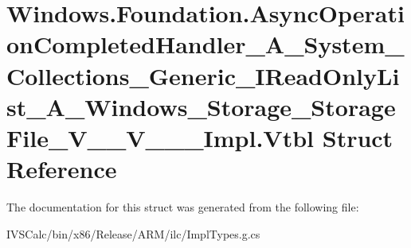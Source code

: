 \hypertarget{struct_windows_1_1_foundation_1_1_async_operation_completed_handler___a___system___collections__d68f20287a98859bed0069097eed06d1}{}\section{Windows.\+Foundation.\+Async\+Operation\+Completed\+Handler\+\_\+\+A\+\_\+\+System\+\_\+\+Collections\+\_\+\+Generic\+\_\+\+I\+Read\+Only\+List\+\_\+\+A\+\_\+\+Windows\+\_\+\+Storage\+\_\+\+Storage\+File\+\_\+\+V\+\_\+\+\_\+\+V\+\_\+\+\_\+\+\_\+\+Impl.\+Vtbl Struct Reference}
\label{struct_windows_1_1_foundation_1_1_async_operation_completed_handler___a___system___collections__d68f20287a98859bed0069097eed06d1}


The documentation for this struct was generated from the following file\+:\begin{DoxyCompactItemize}
\item 
I\+V\+S\+Calc/bin/x86/\+Release/\+A\+R\+M/ilc/Impl\+Types.\+g.\+cs\end{DoxyCompactItemize}
